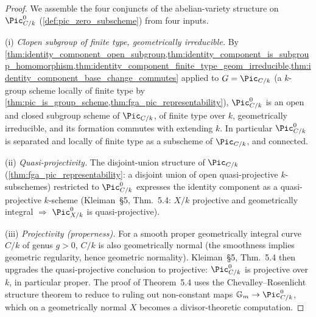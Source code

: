 \begin{proof}
  We assemble the four conjuncts of the abelian-variety structure on
  \(\Pic^0_{C/k}\) (\cref{def:pic_zero_subscheme}) from four inputs.

  (i) \emph{Clopen subgroup of finite type, geometrically irreducible.}
  By
  \cref{thm:identity_component_open_subgroup,thm:identity_component_is_subgroup_homomorphism,thm:identity_component_finite_type_geom_irreducible,thm:identity_component_base_change_commutes}
  applied to \(G = \Pic_{C/k}\) (a \(k\)-group scheme locally of finite
  type by
  \cref{thm:pic_is_group_scheme,thm:fga_pic_representability}),
  \(\Pic^0_{C/k}\) is an open and closed subgroup scheme of \(\Pic_{C/k}\),
  of finite type over \(k\), geometrically irreducible, and its
  formation commutes with extending \(k\). In particular \(\Pic^0_{C/k}\)
  is separated and locally of finite type as a subscheme of
  \(\Pic_{C/k}\), and connected.

  (ii) \emph{Quasi-projectivity.} The disjoint-union structure of
  \(\Pic_{C/k}\) (\cref{thm:fga_pic_representability}: a disjoint union
  of open quasi-projective \(k\)-subschemes) restricted to \(\Pic^0_{C/k}\)
  expresses the identity component as a quasi-projective \(k\)-scheme
  (Kleiman~\S 5, Thm.~5.4: \(X/k\) projective and geometrically
  integral \(\Longrightarrow\) \(\Pic^0_{X/k}\) is quasi-projective).

  (iii) \emph{Projectivity (properness).} For a smooth proper
  geometrically integral curve \(C/k\) of genus \(g > 0\), \(C/k\) is
  also geometrically normal (the smoothness implies geometric
  regularity, hence geometric normality). Kleiman~\S 5, Thm.~5.4
  then upgrades the quasi-projective conclusion to projective:
  \(\Pic^0_{C/k}\) is projective over \(k\), in particular proper.
  The proof of Theorem~5.4 uses the Chevalley--Rosenlicht structure
  theorem to reduce to ruling out non-constant maps
  \(\mathbb G_m \to \Pic^0_{C/k}\), which on a geometrically normal
  \(X\) becomes a divisor-theoretic computation.


\end{proof}
